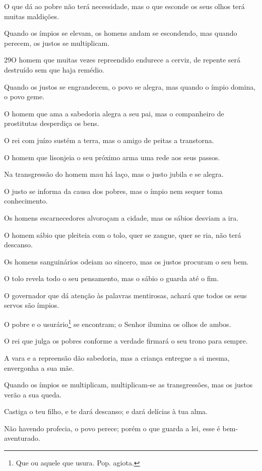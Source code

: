 O que dá ao pobre não terá necessidade, mas o que esconde os seus
olhos terá muitas maldições.

Quando os ímpios se elevam, os homens andam se escondendo, mas
quando perecem, os justos se multiplicam.

\medskip

\lettrine{29}{}O homem que muitas vezes repreendido endurece a
cerviz, de repente será destruído sem que haja remédio.

Quando os justos se engrandecem, o povo se alegra, mas quando o
ímpio domina, o povo geme.

O homem que ama a sabedoria alegra a seu pai, mas o companheiro de
prostitutas desperdiça os bens.

O rei com juízo sustém a terra, mas o amigo de peitas a
transtorna.

O homem que lisonjeia o seu próximo arma uma rede aos seus passos.

Na transgressão do homem mau há laço, mas o justo jubila e se
alegra.

O justo se informa da causa dos pobres, mas o ímpio nem sequer
toma conhecimento.

Os homens escarnecedores alvoroçam a cidade, mas os sábios desviam
a ira.

O homem sábio que pleiteia com o tolo, quer se zangue, quer se
ria, não terá descanso.

Os homens sanguinários odeiam ao sincero, mas os justos procuram
o seu bem.

O tolo revela todo o seu pensamento, mas o sábio o guarda até o
fim.

O governador que dá atenção às palavras mentirosas, achará que
todos os seus servos são ímpios.

O pobre e o usurário\footnote{Que ou aquele que usura. Pop.
agiota.} se encontram; o Senhor ilumina os olhos de ambos.

O rei que julga os pobres conforme a verdade firmará o seu trono
para sempre.

A vara e a repreensão dão sabedoria, mas a criança entregue a si
mesma, envergonha a sua mãe.

Quando os ímpios se multiplicam, multiplicam-se as transgressões,
mas os justos verão a sua queda.

Castiga o teu filho, e te dará descanso; e dará delícias à tua
alma.

Não havendo profecia, o povo perece; porém o que guarda a lei,
esse é bem-aventurado.

